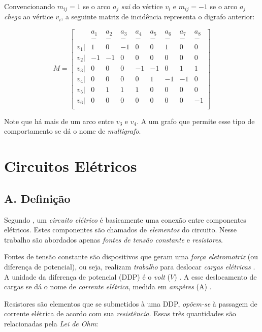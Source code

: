 \documentclass[twocolumn, 10pt]{extarticle}
\begin{document}
Convencionando $m_{ij} = 1$ se o arco $a_j$ \textit{sai} do vértice $v_i$ e $m_{ij} = -1$ se o arco $a_j$ \textit{chega} ao vértice $v_i$, a seguinte matriz de incidência representa o digrafo anterior:

\[
M = 
\left[
\begin{smallmatrix}
 & a_1 & a_2 & a_3 & a_4 & a_5 & a_6 & a_7 & a_8 \\
 & - & - & - & - & - & - & - & - \\
 v_1 |& 1 & 0 & -1 & 0 & 0 & 1 & 0 & 0\\
 v_2 |& -1 & -1 & 0 & 0 & 0 & 0 & 0 & 0\\
 v_3 |& 0 & 0 & 0 & -1 & -1 & 0 & 1 & 1\\
 v_4 |& 0 & 0 & 0 & 0 & 1 & -1 & -1 & 0\\
 v_5 |& 0 & 1 & 1 & 1 & 0 & 0 & 0 & 0\\
 v_6 |& 0 & 0 & 0 & 0 & 0 & 0 & 0 & -1\\
  &  &  &  &  &  & &  & 
\end{smallmatrix}\right]
\]

Note que há mais de um arco entre $v_3$ e $v_4$. A um grafo que permite esse tipo de comportamento se dá o nome de \textit{multigrafo}. 

\section{Circuitos Elétricos}

\subsection*{A. \quad Definição}

Segundo \cite[p. 4]{sadiku}, um \textit{circuito elétrico} é basicamente uma conexão entre componentes elétricos. Estes componentes são chamados de \textit{elementos} do circuito. Nesse trabalho são abordados apenas \textit{fontes de tensão constante} e \textit{resistores}.

Fontes de tensão constante são dispositivos que geram uma \textit{força eletromotriz} (ou diferença de potencial), ou seja, realizam \textit{trabalho} para deslocar \textit{cargas elétricas} \cite[p. 8]{sadiku}. A unidade da diferença de potencial (DDP) é o \textit{volt} ($V$) \cite[p. 9]{sadiku}. A esse deslocamento de cargas se dá o nome de \textit{corrente elétrica}, medida em \textit{ampères} (A) \cite[p. 6]{sadiku}.

Resistores são elementos que se submetidos à uma DDP, \textit{opõem-se} à passagem de corrente elétrica \cite[p. 28]{sadiku} de acordo com sua \textit{resistência}. Essas três quantidades são relacionadas pela \textit{Lei de Ohm}:
\end{document}
